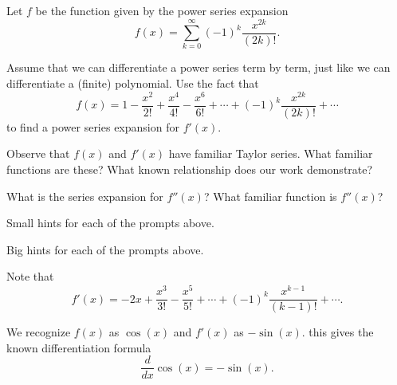 \begin{activity} \label{8.6.Act3} Let $f$ be the function given by the power series expansion
\[f(x) = \sum_{k=0}^{\infty} (-1)^k \frac{x^{2k}}{(2k)!}.\]
\ba
\item Assume that we can differentiate a power series term by term, just like we can differentiate a (finite) polynomial. Use the fact that
\[f(x) = 1 - \frac{x^2}{2!} + \frac{x^4}{4!} - \frac{x^6}{6!} + \cdots + (-1)^k \frac{x^{2k}}{(2k)!} + \cdots \]
to find a power series expansion for $f'(x)$.

\item Observe that $f(x)$ and $f'(x)$ have familiar Taylor series.  What familiar functions are these? What known relationship does our work demonstrate?

\item What is the series expansion for $f''(x)$?  What familiar function is $f''(x)$?

\ea


\end{activity}

\begin{smallhint}
\ba
	\item Small hints for each of the prompts above.
\ea
\end{smallhint}
\begin{bighint}
\ba
	\item Big hints for each of the prompts above.
\ea
\end{bighint}
\begin{activitySolution}
\ba
\item Note that
\[f'(x) = - 2x + \frac{x^3}{3!} - \frac{x^5}{5!} + \cdots + (-1)^k \frac{x^{k-1}}{(k-1)!} + \cdots .\]
\item We recognize $f(x)$ as $\cos(x)$ and $f'(x)$ as $-\sin(x)$. this gives the known differentiation formula
\[\frac{d}{dx} \cos(x) = -\sin(x).\]
\ea
\end{activitySolution}
\aftera 